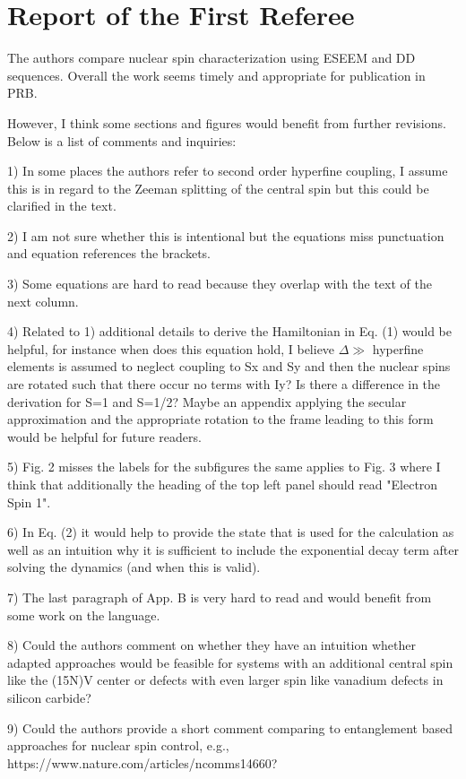 \documentclass[12pt]{amsart}
\begin{document}
	\color{red} \section{ Report of the First Referee}
	The authors compare nuclear spin characterization using ESEEM and DD
	sequences. Overall the work seems timely and appropriate for
	publication in PRB.
	
	However, I think some sections and figures would benefit from further
	revisions. Below is a list of comments and inquiries:
	
	1) In some places the authors refer to second order hyperfine
	coupling, I assume this is in regard to the Zeeman splitting of the
	central spin but this could be clarified in the text.
	
	2) I am not sure whether this is intentional but the equations miss
	punctuation and equation references the brackets.
	
	3) Some equations are hard to read because they overlap with the text
	of the next column.
	
	4) Related to 1) additional details to derive the Hamiltonian in Eq.
	(1) would be helpful, for instance when does this equation hold, I
	believe $\Delta \gg$ hyperfine elements is assumed to neglect coupling to Sx and
	Sy and then the nuclear spins are rotated such that there occur no
	terms with Iy? Is there a difference in the derivation for S=1 and
	S=1/2? Maybe an appendix applying the secular approximation and the
	appropriate rotation to the frame leading to this form would be
	helpful for future readers.
	
	5) Fig. 2 misses the labels for the subfigures the same applies to
	Fig. 3 where I think that additionally the heading of the top left
	panel should read "Electron Spin 1".
	
	6) In Eq. (2) it would help to provide the state that is used for the
	calculation as well as an intuition why it is sufficient to include
	the exponential decay term after solving the dynamics (and when this
	is valid).
	
	7) The last paragraph of App. B is very hard to read and would benefit
	from some work on the language.
	
	8) Could the authors comment on whether they have an intuition whether
	adapted approaches would be feasible for systems with an additional
	central spin like the (15N)V center or defects with even larger spin
	like vanadium defects in silicon carbide?
	
	9) Could the authors provide a short comment comparing to entanglement
	based approaches for nuclear spin control, e.g.,
	https://www.nature.com/articles/ncomms14660?
	
\end{document}
